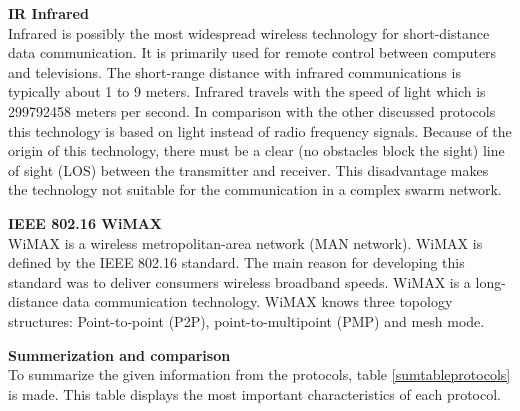 \documentclass[10pt,a4paper]{article}
\begin{document}
\textbf{\large IR Infrared}\\
Infrared is possibly the most widespread wireless technology for short-distance data communication. \cite{combook} It is primarily used for remote control between computers and televisions. The short-range distance with infrared communications is typically about 1 to 9 meters. \cite{combook} Infrared travels with the speed of light which is 299792458 meters per second. \cite{speedoflight} In comparison with the other discussed protocols this technology is based on light instead of radio frequency signals. Because of the origin of this technology, there must be a clear (no obstacles block the sight) line of sight (LOS) between the transmitter and receiver. This disadvantage makes the technology not suitable for the communication in a complex swarm network.

\textbf{\large IEEE 802.16 WiMAX}\\
WiMAX is a wireless metropolitan-area network (MAN network). WiMAX is defined by the IEEE 802.16 standard. The main reason for developing this standard was to deliver consumers wireless broadband speeds. WiMAX is a long-distance data communication technology. WiMAX knows three topology structures: Point-to-point (P2P), point-to-multipoint (PMP) and mesh mode.



\textbf{\large Summerization and comparison}\\
To summarize the given information from the protocols, table \ref{sumtableprotocols} is made.
This table displays the most important characteristics of each protocol.
\end{document}
